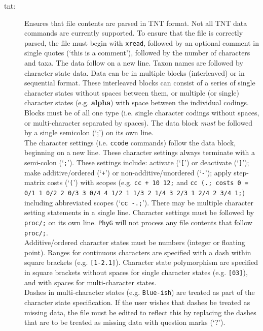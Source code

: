 \begin{description}
		\item [tnt:] Ensures that file contents are parsed in TNT \citep{Goloboffetal2008} format. 
		Not all TNT data commands are currently supported. To ensure that the file is correctly
		parsed, the file must begin with \texttt{xread}, followed by an optional comment in single 
		quotes (`this is a comment'), followed by the number of characters and taxa. The data 
		follow on a new line. Taxon names are followed by character state data. Data can be in 
		multiple blocks (interleaved) or in sequential format. These interleaved blocks can consist 
		of a series of single character states without spaces between them, or multiple (or single) 
		character states (e.g. \textbf{alpha}) with space between the individual codings. Blocks 
		must be of all one type (i.e. single character codings without spaces, or multi-character 
		separated by spaces). The data block \textit{must} be followed by a single semicolon 
		(`;') on its own line.\\
			
		The character settings (i.e. \texttt{ccode} commands) follow the data block, beginning 
		on a 	new line. These character settings always terminate with a semi-colon (`\texttt{;}'). 
		These settings include: activate (`\texttt{[}') or deactivate (`\texttt{]}'); make additive/ordered 
		(`\texttt{+}') or non-additive/unordered (`\texttt{-}'); apply step-matrix costs (`\texttt{(}') with 
		scopes (e.g. \texttt{cc + 10 12;} and  \texttt{cc (.; costs 0 = 0/1 1 0/2 2 0/3 3 0/4 4 1/2 1 
		1/3 2 1/4 3 2/3 1 2/4 2 3/4 1;}) including abbreviated scopes (`\texttt{cc -.;}'). There may 
		be multiple character setting statements in a single line. Character settings must be 
		followed by \texttt{proc/;} on its own line. \texttt{PhyG} will not process
		any file contents that follow \texttt{proc/;}.\\
		  
		 Additive/ordered character states must be numbers (integer or floating point). Ranges 
		 for continuous characters are specified with a dash within square brackets (e.g. 
		 \texttt{[1-2.1]}). Character state polymorphism are specified in square brackets without 
		 spaces for single character states (e.g. \texttt{[03]}), and with spaces for multi-character 
		 states.\\
		  
		 Dashes in multi-character states (e.g. \texttt{Blue-ish}) 
		 are treated as part of the character state specification. If the user wishes that dashes 
		 be treated as missing data, the file must be edited to reflect this by replacing the 
		 dashes that are to be treated as missing data with question 
		 marks (`?').\\
		  

\end{description}
